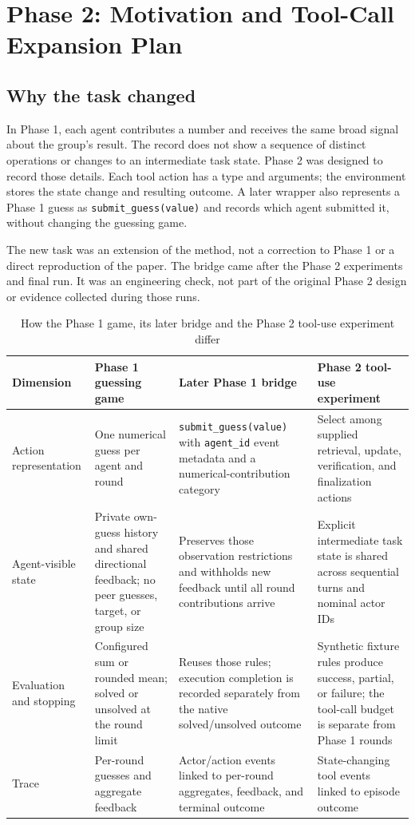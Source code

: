 \documentclass[12pt,a4paper,oneside]{report}
\begin{document}
\chapter{Phase 2: Motivation and Tool-Call Expansion Plan}
\label{chapter-04}
\thispagestyle{plain}
\section{Why the task changed}
In Phase 1, each agent contributes a number and receives the same broad signal about the group’s result. The record does not show a sequence of distinct operations or changes to an intermediate task state. Phase 2 was designed to record those details. Each tool action has a type and arguments; the environment stores the state change and resulting outcome. A later wrapper also represents a Phase 1 guess as \texttt{submit\allowbreak\_guess(value)} and records which agent submitted it, without changing the guessing game.

The new task was an extension of the method, not a correction to Phase 1 or a direct reproduction of the paper. The bridge came after the Phase 2 experiments and final run. It was an engineering check, not part of the original Phase 2 design or evidence collected during those runs.

\begin{table}[htbp]
\centering
\small
\setlength{\tabcolsep}{4pt}
\begin{tabularx}{\linewidth}{|Y|Y|Y|Y|}
\hline
\textbf{Dimension} & \textbf{Phase 1 guessing game} & \textbf{Later Phase 1 bridge} & \textbf{Phase 2 tool-use experiment} \\
\hline
Action representation & One numerical guess per agent and round & \texttt{submit\allowbreak\_guess(value)} with \texttt{agent\allowbreak\_id} event metadata and a numerical-contribution category & Select among supplied retrieval, update, verification, and finalization actions \\
\hline
Agent-visible state & Private own-guess history and shared directional feedback; no peer guesses, target, or group size & Preserves those observation restrictions and withholds new feedback until all round contributions arrive & Explicit intermediate task state is shared across sequential turns and nominal actor IDs \\
\hline
Evaluation and stopping & Configured sum or rounded mean; solved or unsolved at the round limit & Reuses those rules; execution completion is recorded separately from the native solved/unsolved outcome & Synthetic fixture rules produce success, partial, or failure; the tool-call budget is separate from Phase 1 rounds \\
\hline
Trace & Per-round guesses and aggregate feedback & Actor/action events linked to per-round aggregates, feedback, and terminal outcome & State-changing tool events linked to episode outcome \\
\hline
\end{tabularx}
\caption{How the Phase 1 game, its later bridge and the Phase 2 tool-use experiment differ}
\end{table}
\end{document}
